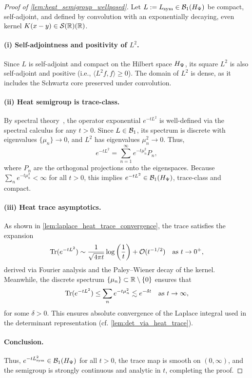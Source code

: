 \begin{proof}[Proof of \cref{lem:heat_semigroup_wellposed}]
Let \( L := L_{\mathrm{sym}} \in \mathcal{B}_1(H_{\Psi}) \) be compact, self-adjoint, and defined by convolution with an exponentially decaying, even kernel \( K(x - y) \in \mathcal{S}(\mathbb{R})(\mathbb{R}) \).

\paragraph{(i) Self-adjointness and positivity of \( L^2 \).}
Since \( L \) is self-adjoint and compact on the Hilbert space \( H_{\Psi} \), its square \( L^2 \) is also self-adjoint and positive (i.e., \( \langle L^2 f, f \rangle \ge 0 \)). The domain of \( L^2 \) is dense, as it includes the Schwartz core preserved under convolution.

\paragraph{(ii) Heat semigroup is trace-class.}
By spectral theory~\cite[Ch.~X, §2]{ReedSimon1975II}, the operator exponential \( e^{-t L^2} \) is well-defined via the spectral calculus for any \( t > 0 \). Since \( L \in \mathcal{B}_1 \), its spectrum is discrete with eigenvalues \( \{ \mu_n \} \to 0 \), and \( L^2 \) has eigenvalues \( \mu_n^2 \to 0 \). Thus,
\[
e^{-t L^2} = \sum_{n=1}^\infty e^{-t \mu_n^2} P_n,
\]
where \( P_n \) are the orthogonal projections onto the eigenspaces. Because \( \sum_n e^{-t \mu_n^2} < \infty \) for all \( t > 0 \), this implies \( e^{-t L^2} \in \mathcal{B}_1(H_{\Psi}) \), trace-class and compact.

\paragraph{(iii) Heat trace asymptotics.}
As shown in \cref{lem:laplace_heat_trace_convergence}, the trace satisfies the expansion
\[
\operatorname{Tr}(e^{-t L^2}) \sim \frac{1}{\sqrt{4\pi t}} \log\left( \frac{1}{t} \right) + \mathcal{O}(t^{-1/2}) \quad \text{as } t \to 0^+,
\]
derived via Fourier analysis and the Paley--Wiener decay of the kernel. Meanwhile, the discrete spectrum \( \{ \mu_n \} \subset \mathbb{R} \setminus \{0\} \) ensures that
\[
\operatorname{Tr}(e^{-t L^2}) \le \sum_n e^{-t \mu_n^2} \lesssim e^{-\delta t} \quad \text{as } t \to \infty,
\]
for some \( \delta > 0 \). This ensures absolute convergence of the Laplace integral used in the determinant representation (cf. \cref{lem:det_via_heat_trace}).

\paragraph{Conclusion.}
Thus, \( e^{-t L_{\mathrm{sym}}^2} \in \mathcal{B}_1(H_{\Psi}) \) for all \( t > 0 \), the trace map is smooth on \( (0, \infty) \), and the semigroup is strongly continuous and analytic in \( t \), completing the proof.
\end{proof}
